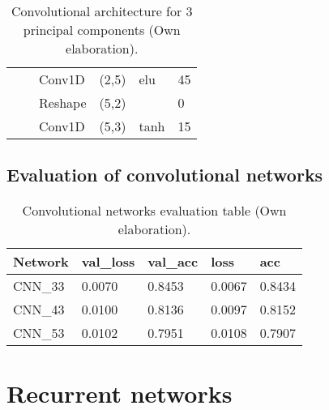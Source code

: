 \begin{table}[H]
\begin{center}
\begin{tabular}{ll|l|l|l|l|}
\multicolumn{1}{|l|}{}                                                                  &                                   & Conv1D                             & (2,5)                                & elu                                     & 45                                          \\ \cline{3-6} 
\multicolumn{1}{|l|}{}                                                                  &                                   & Reshape                            & (5,2)                                &                                          & 0                                           \\ \cline{3-6} 
\multicolumn{1}{|l|}{}                                                                  &                                   & Conv1D                             & (5,3)                                & tanh                                     & 15                                          \\ \hline
\end{tabular}

\end{center}
\caption{Convolutional architecture for 3 principal components (Own elaboration).}
\label{table:cnn_3}
\end{table}

\subsection{Evaluation of convolutional networks}

\begin{table}[H]
\centering
\begin{tabular}{|l|l|l|l|l|}
\hline
\textbf{Network} & \textbf{val\_loss} & \textbf{val\_acc} & \textbf{loss} & \textbf{acc} \\ \hline
CNN\_33 & 0.0070 & 0.8453 & 0.0067 & 0.8434 \\ \hline
CNN\_43 & 0.0100 & 0.8136 & 0.0097 & 0.8152 \\ \hline
CNN\_53 & 0.0102 & 0.7951 & 0.0108 & 0.7907 \\ \hline
\end{tabular}
\caption{Convolutional networks evaluation table (Own elaboration).}
\label{table:evaluacion_cnn}
\end{table}

\section{Recurrent networks}

